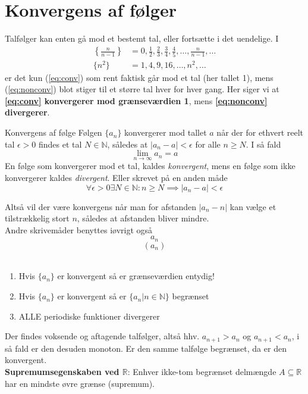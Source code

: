 \section{Konvergens af følger}
Talfølger kan enten gå mod et bestemt tal, eller fortsætte i det uendelige. I\begin{align}
    \left\{\frac{n}{n-1}\right\}&=0,\frac{1}{2},\frac{2}{3},\frac{3}{4},\frac{4}{5},\ldots,\frac{n}{n-1},\ldots\label{eq:conv}\\
    \{n^2\}&=1,4,9,16,\ldots,n^2,\ldots\label{eq:nonconv}
\end{align}
er det kun (\ref{eq:conv}) som rent faktisk går mod et tal (her tallet 1), mens (\ref{eq:nonconv}) blot stiger til et større tal hver for hver gang. Her siger vi at \textbf{\ref{eq:conv} konvergerer mod grænseværdien 1}, mens \textbf{\ref{eq:nonconv} divergerer}.
\begin{definition}{Konvergens af følge}
Følgen $\{a_n\}$ konvergerer mod tallet $a$ når der for ethvert reelt tal $\epsilon>0$ findes et tal $N\in\mathbb{N}$, således at $|a_n-a|<\epsilon$ for alle $n\geq N$. I så fald\begin{equation}
    \lim_{n\to\infty}a_n=a
\end{equation}En følge som konvergerer mod et tal, kaldes \textit{konvergent}, mens en følge som ikke konvergerer kaldes \textit{divergent}. Eller skrevet på en anden måde$$\forall\epsilon>0\exists N\in\mathbb{N}:n\geq N\implies|a_n-a|<\epsilon$$\end{definition}
Altså vil der være konvergens når man for afstanden $|a_n-n|$ kan vælge et tilstrækkelig stort $n$, således at afstanden bliver mindre.\\ Andre skrivemåder benyttes iøvrigt også$$a_n$$$$(a_n)$$\\
\begin{enumerate}
    \item Hvis $\{a_n\}$ er konvergent så er grænseværdien entydig!
    \item Hvis $\{a_n\}$ er konvergent så er $\{a_n|n\in\mathbb{N}\}$ begrænset
    \item ALLE periodiske funktioner divergerer
\end{enumerate}
Der findes voksende og aftagende talfølger, altså hhv. $a_{n+1}>a_n$ og $a_{n+1}<a_n$, i så fald er den desuden monoton. Er den samme talfølge begrænset, da er den konvergent. \\
\textbf{Supremumsegenskaben ved $\mathbb{R}$}: Enhver ikke-tom begrænset delmængde $A\subseteq\mathbb{R}$ har en mindste øvre grænse (supremum).
